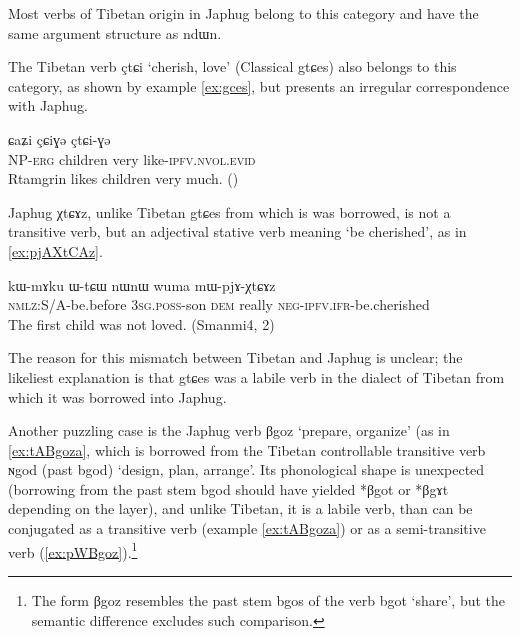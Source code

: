 \documentclass[oldfontcommands,oneside,a4paper,11pt]{article}
\newcommand{\ipa}[1]{{\phon \mbox{#1}}} %
\begin{document}
Most verbs of Tibetan origin in Japhug belong to this category and have the same argument structure as \ipa{ndɯn}. 



The Tibetan verb \ipa{çtɕi} `cherish, love' (Classical \ipa{gtɕes}) also belongs to this category, as shown by example \ref{ex:gces}, but presents an irregular correspondence with Japhug.

\begin{exe}
\ex \label{ex:gces}
\gll \ipa{ʂtamɖʐən-ɣə}  \ipa{ɕaʑi} \ipa{çɕiɣə}  \ipa{çtɕi-ɣə} \\
NP-\textsc{erg} children very like-\textsc{ipfv.nvol.evid} \\
\glt Rtamgrin likes children very much. (\citealt[86:186]{haller04themchen})
\end{exe}

Japhug \ipa{χtɕɤz}, unlike Tibetan \ipa{gtɕes} from which is was borrowed, is not a transitive verb, but an adjectival stative verb meaning `be cherished', as in \ref{ex:pjAXtCAz}. 

\begin{exe}
\ex \label{ex:pjAXtCAz}
\gll
\ipa{kɯ-mɤku} 	\ipa{ɯ-tɕɯ} 	\ipa{nɯnɯ} 	\ipa{wuma} 	\ipa{mɯ-pjɤ-χtɕɤz} \\
\textsc{nmlz}:S/A-be.before \textsc{3sg.poss}-son \textsc{dem} really \textsc{neg-ipfv.ifr}-be.cherished \\
\glt The first child was not loved. (Smanmi4, 2)
\end{exe}

The reason for this mismatch between Tibetan and Japhug is unclear; the likeliest explanation is that \ipa{gtɕes} was a labile verb in the dialect of Tibetan from which it was borrowed into Japhug.


Another puzzling case is the Japhug verb \ipa{βgoz} `prepare, organize' (as in \ref{ex:tABgoza}, which is borrowed from the Tibetan controllable transitive verb \ipa{ɴgod} (past \ipa{bgod}) `design, plan, arrange'. Its phonological shape is unexpected (borrowing from the past stem \ipa{bgod} should have yielded *\ipa{βgot} or *\ipa{βgɤt} depending on the layer), and unlike Tibetan, it is a labile verb, than can be conjugated as a transitive verb (example \ref{ex:tABgoza}) or as a semi-transitive verb (\ref{ex:pWBgoz}).\footnote{The form \ipa{βgoz} resembles the past stem \ipa{bgos} of the verb \ipa{bgot} `share', but the semantic difference excludes such comparison.} 
\end{document}
